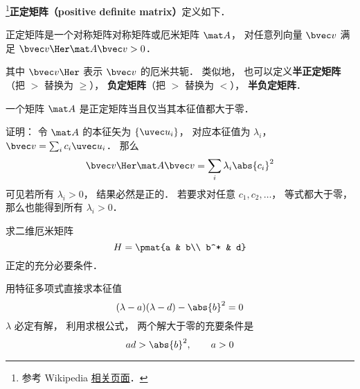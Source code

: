 
\begin{issues}
\issueTODO
\end{issues}


\footnote{参考 Wikipedia \href{https://en.wikipedia.org/wiki/Definite_matrix}{相关页面}．}\textbf{正定矩阵（positive definite matrix）}定义如下．
\begin{definition}{}
正定矩阵是一个对称矩阵对称矩阵或厄米矩阵 $\mat A$， 对任意列向量 $\bvec v$ 满足 $\bvec v\Her \mat A \bvec v > 0$．
\end{definition}
其中 $\bvec v\Her$ 表示 $\bvec v$ 的厄米共轭． 类似地， 也可以定义\textbf{半正定矩阵}（把 $>$ 替换为 $\geqslant$）， \textbf{负定矩阵}（把 $>$ 替换为 $<$）， \textbf{半负定矩阵}．

\begin{theorem}{}
一个矩阵 $\mat A$ 是正定矩阵当且仅当其本征值都大于零．
\end{theorem}

证明： 令 $\mat A$ 的本征矢为 $\{\uvec u_i\}$， 对应本征值为 $\lambda_i$， $\bvec v = \sum_i c_i \uvec u_i$． 那么
\begin{equation}
\bvec v\Her \mat A \bvec v = \sum_i \lambda_i \abs{c_i}^2
\end{equation}
可见若所有 $\lambda_i > 0$， 结果必然是正的． 若要求对任意 $c_1,c_2,\dots$， 等式都大于零， 那么也能得到所有 $\lambda_i > 0$．

\begin{example}{}
求二维厄米矩阵
\begin{equation}
H = \pmat{a & b\\ b^* & d}
\end{equation}
正定的充分必要条件．

用特征多项式直接求本征值
\begin{equation}
(\lambda - a)(\lambda - d) - \abs{b}^2 = 0
\end{equation}
$\lambda$ 必定有解， 利用求根公式， 两个解大于零的充要条件是
\begin{equation}
ad > \abs{b}^2, \qquad
a > 0
\end{equation}
\end{example}
